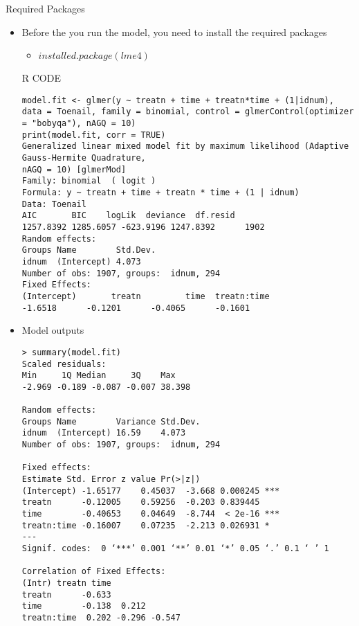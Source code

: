 \documentclass{beamer}
\begin{document}
\begin{frame}[fragile]{Required Packages}
\begin{itemize}
	\item Before the you run the model, you need to install the required packages
	\begin{itemize}
		\item $installed.package(lme4)$ 
	\end{itemize}
{\color{red}R CODE}
\scriptsize
 \begin{verbatim}
model.fit <- glmer(y ~ treatn + time + treatn*time + (1|idnum), 
data = Toenail, family = binomial, control = glmerControl(optimizer 
= "bobyqa"), nAGQ = 10)
print(model.fit, corr = TRUE)
Generalized linear mixed model fit by maximum likelihood (Adaptive Gauss-Hermite Quadrature,
nAGQ = 10) [glmerMod]
Family: binomial  ( logit )
Formula: y ~ treatn + time + treatn * time + (1 | idnum)
Data: Toenail
AIC       BIC    logLik  deviance  df.resid 
1257.8392 1285.6057 -623.9196 1247.8392      1902 
Random effects:
Groups Name        Std.Dev.
idnum  (Intercept) 4.073   
Number of obs: 1907, groups:  idnum, 294
Fixed Effects:
(Intercept)       treatn         time  treatn:time  
-1.6518      -0.1201      -0.4065      -0.1601 
\end{verbatim}
\end{itemize}
\end{frame}


\begin{frame}[fragile]
\scriptsize
\begin{itemize}
	\item Model outputs 
	\begin{verbatim}
> summary(model.fit)
Scaled residuals: 
Min     1Q Median     3Q    Max 
-2.969 -0.189 -0.087 -0.007 38.398 

Random effects:
Groups Name        Variance Std.Dev.
idnum  (Intercept) 16.59    4.073   
Number of obs: 1907, groups:  idnum, 294

Fixed effects:
Estimate Std. Error z value Pr(>|z|)    
(Intercept) -1.65177    0.45037  -3.668 0.000245 ***
treatn      -0.12005    0.59256  -0.203 0.839445    
time        -0.40653    0.04649  -8.744  < 2e-16 ***
treatn:time -0.16007    0.07235  -2.213 0.026931 *  
---
Signif. codes:  0 ‘***’ 0.001 ‘**’ 0.01 ‘*’ 0.05 ‘.’ 0.1 ‘ ’ 1

Correlation of Fixed Effects:
(Intr) treatn time  
treatn      -0.633              
time        -0.138  0.212       
treatn:time  0.202 -0.296 -0.547
	\end{verbatim}
\end{itemize}
\end{frame}
\end{document}

